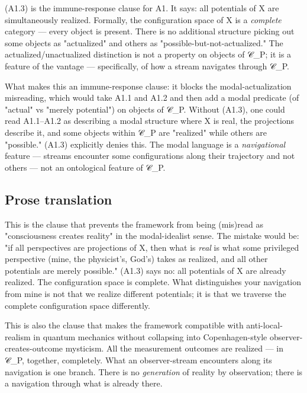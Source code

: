 \documentclass[11pt, openany]{book}
\begin{document}
(A1.3) is the immune-response clause for A1. It says: all potentials of X are simultaneously realized. Formally, the configuration space of X is a \textit{complete} category --- every object is present. There is no additional structure picking out some objects as "actualized" and others as "possible-but-not-actualized." The actualized/unactualized distinction is not a property on objects of 𝒞\_\allowbreak{}P; it is a feature of the vantage --- specifically, of how a stream navigates through 𝒞\_\allowbreak{}P.

What makes this an immune-response clause: it blocks the modal-actualization misreading, which would take A1.1 and A1.2 and then add a modal predicate (of "actual" vs "merely potential") on objects of 𝒞\_\allowbreak{}P. Without (A1.3), one could read A1.1–A1.2 as describing a modal structure where X is real, the projections describe it, and some objects within 𝒞\_\allowbreak{}P are "realized" while others are "possible." (A1.3) explicitly denies this. The modal language is a \textit{navigational} feature --- streams encounter some configurations along their trajectory and not others --- not an ontological feature of 𝒞\_\allowbreak{}P.

\subsection{Prose translation}

This is the clause that prevents the framework from being (mis)read as "consciousness creates reality" in the modal-idealist sense. The mistake would be: "if all perspectives are projections of X, then what is \textit{real} is what some privileged perspective (mine, the physicist's, God's) takes as realized, and all other potentials are merely possible." (A1.3) says no: all potentials of X are already realized. The configuration space is complete. What distinguishes your navigation from mine is not that we realize different potentials; it is that we traverse the complete configuration space differently.

This is also the clause that makes the framework compatible with anti-local-realism in quantum mechanics without collapsing into Copenhagen-style observer-creates-outcome mysticism. All the measurement outcomes are realized --- in 𝒞\_\allowbreak{}P, together, completely. What an observer-stream encounters along its navigation is one branch. There is no \textit{generation} of reality by observation; there is a navigation through what is already there.
\end{document}
